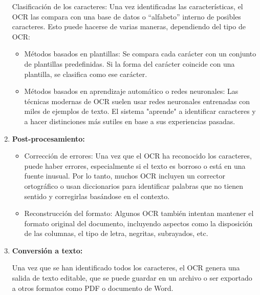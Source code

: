 \begin{enumerate}
	Clasificación de los caracteres: Una vez identificadas las características, el OCR las compara con una base de datos o ``alfabeto'' interno de posibles caracteres. Esto puede hacerse de varias maneras, dependiendo del tipo de OCR:
	\begin{itemize}
		\item Métodos basados en plantillas: Se compara cada carácter con un conjunto de plantillas predefinidas. Si la forma del carácter coincide con una plantilla, se clasifica como ese carácter.
		\item Métodos basados en aprendizaje automático o redes neuronales: Las técnicas modernas de OCR suelen usar redes neuronales entrenadas con miles de ejemplos de texto. El sistema "aprende" a identificar caracteres y a hacer distinciones más sutiles en base a sus experiencias pasadas.
	\end{itemize}
		\item \textbf{Post-procesamiento:}
	
	\begin{itemize}
		\item Corrección de errores: Una vez que el OCR ha reconocido los caracteres, puede haber errores, especialmente si el texto es borroso o está en una fuente inusual. Por lo tanto, muchos OCR incluyen un corrector ortográfico o usan diccionarios para identificar palabras que no tienen sentido y corregirlas basándose en el contexto.
		\item Reconstrucción del formato: Algunos OCR también intentan mantener el formato original del documento, incluyendo aspectos como la disposición de las columnas, el tipo de letra, negritas, subrayados, etc.
		
	\end{itemize}
		\item \textbf{Conversión a texto:}
		
		Una vez que se han identificado todos los caracteres, el OCR genera una salida de texto editable, que se puede guardar en un archivo o ser exportado a otros formatos como PDF o documento de Word.
	
		
\end{enumerate}
	
